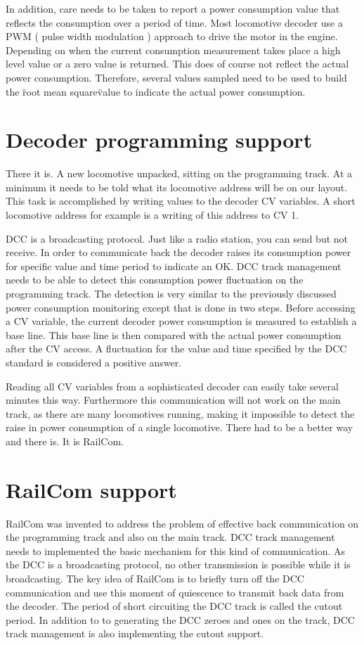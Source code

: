 In addition, care needs to be taken to report a power consumption value that reflects the consumption over a period of time. Most locomotive decoder use a PWM ( pulse width modulation ) approach to drive the motor in the engine. Depending on when the current consumption measurement takes place a high level value or a zero value is returned. This does of course not reflect the actual power consumption. Therefore, several values sampled need to be used to build the \"root mean square\" value to indicate the actual power consumption.

\section{Decoder programming support}

There it is. A new locomotive unpacked, sitting on the programming track. At a minimum it needs to be told what its locomotive address will be on our layout. This task is accomplished by writing values to the decoder CV variables. A short locomotive address for example is a writing of this address to CV 1.

DCC is a broadcasting protocol. Just like a radio station, you can send but not receive. In order to communicate back the decoder raises its consumption power for specific value and time period to indicate an OK. DCC track management needs to be able to detect this consumption power fluctuation on the programming track. The detection is very similar to the previously discussed power consumption monitoring except that is done in two steps. Before accessing a CV variable, the current decoder power consumption is measured to establish a base line. This base line is then compared with the actual power consumption after the CV access. A fluctuation for the value and time specified by the DCC standard is considered a positive answer.

Reading all CV variables from a sophisticated decoder can easily take several minutes this way. Furthermore this communication will not work on the main track, as there are many locomotives running, making it impossible to detect the raise in power consumption of a single locomotive. There had to be a better way and there is. It is RailCom.

\section{RailCom support}

RailCom was invented to address the problem of effective back communication on the programming track and also on the main track. DCC track management needs to implemented the basic mechanism for this kind of communication. As the DCC is a broadcasting protocol, no other transmission is possible while it is broadcasting. The key idea of RailCom is to briefly turn off the DCC communication and use this moment of quiescence to transmit back data from the decoder. The period of short circuiting the DCC track is called the cutout period. In addition to to generating the DCC zeroes and ones on the track, DCC track management is also implementing the cutout support.

